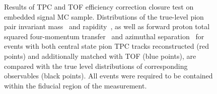 \begin{figure}[h]
{\begin{subfigure}[b]{\linewidth}
  \end{subfigure}
}%
\caption[Results of TPC and TOF efficiency correction closure test on embedded signal MC sample.]{Results of TPC and TOF efficiency correction closure test on embedded signal MC sample. Distributions of the true-level pion pair invariant mass~ and rapidity~, as well as forward proton total squared four-momentum transfer~ and azimuthal separation~ for events with both central state pion TPC tracks reconstructed (red points) and additionally matched with TOF (blue points), are compared with the true level distributions of corresponding observables (black points). All events were required to be contained within the fiducial region of the measurement.}\label{fig:closureTestTpcTof}%
\end{figure}






